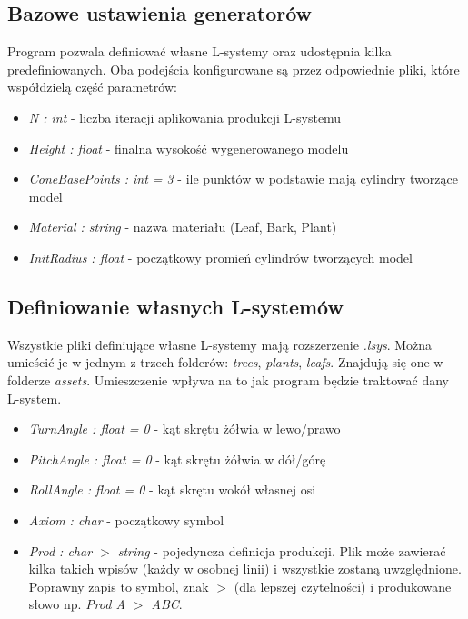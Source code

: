 \documentclass[inz,longabstract]{iithesis}
\begin{document}
        \subsection{Bazowe ustawienia generatorów}
        Program pozwala definiować własne L-systemy oraz udostępnia kilka predefiniowanych. Oba podejścia konfigurowane są przez odpowiednie pliki, które współdzielą część parametrów:
        
        \begin{itemize}
            \item \textit{N : int} - liczba iteracji aplikowania produkcji L-systemu 
            \item \textit{Height : float} - finalna wysokość wygenerowanego modelu
            \item \textit{ConeBasePoints : int = 3} - ile punktów w podstawie mają cylindry tworzące model
            \item \textit{Material : string} - nazwa materiału (Leaf, Bark, Plant)
            \item \textit{InitRadius : float} - początkowy promień cylindrów tworzących model
        \end{itemize}
        
        \subsection{Definiowanie własnych L-systemów}
        Wszystkie pliki definiujące własne L-systemy mają rozszerzenie \textit{.lsys}. Można umieścić je w jednym z trzech folderów: \textit{trees}, \textit{plants}, \textit{leafs}. Znajdują się one w folderze \textit{assets}. Umieszczenie wpływa na to jak program będzie traktować dany L-system.
        
        \begin{itemize}
            \item \textit{TurnAngle : float = 0} - kąt skrętu żółwia w lewo/prawo
            \item \textit{PitchAngle : float = 0} - kąt skrętu żółwia w dół/górę 
            \item \textit{RollAngle : float = 0} - kąt skrętu wokół własnej osi
            \item \textit{Axiom : char} - początkowy symbol
            \item \textit{Prod : char $>$ string } - pojedyncza definicja produkcji. Plik może zawierać kilka takich wpisów (każdy w osobnej linii) i wszystkie zostaną uwzględnione. Poprawny zapis to symbol, znak $>$ (dla lepszej czytelności) i produkowane słowo np. \textit{Prod A $>$ ABC}. 
        \end{itemize}
        
\end{document}
